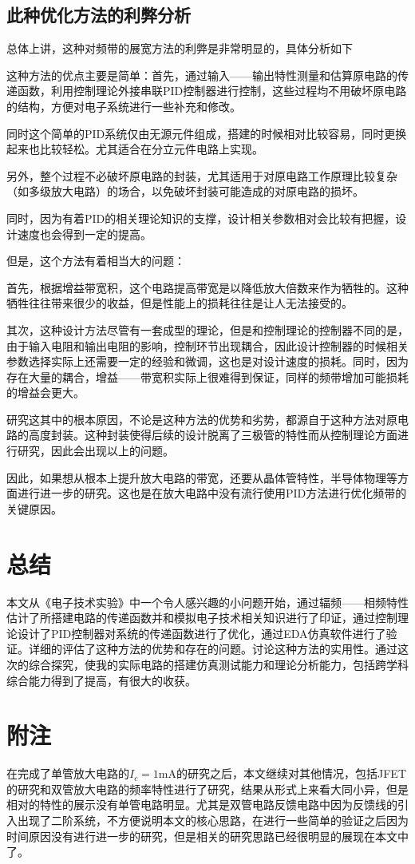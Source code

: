 \documentclass[UTF8,a4paper]{paper}
\begin{document}
\subsection{此种优化方法的利弊分析}
总体上讲，这种对频带的展宽方法的利弊是非常明显的，具体分析如下

这种方法的优点主要是简单：首先，通过输入——输出特性测量和估算原电路的传递函数，利用控制理论外接串联PID控制器进行控制，这些过程均不用破坏原电路的结构，方便对电子系统进行一些补充和修改。

同时这个简单的PID系统仅由无源元件组成，搭建的时候相对比较容易，同时更换起来也比较轻松。尤其适合在分立元件电路上实现。

另外，整个过程不必破坏原电路的封装，尤其适用于对原电路工作原理比较复杂（如多级放大电路）的场合，以免破坏封装可能造成的对原电路的损坏。

同时，因为有着PID的相关理论知识的支撑，设计相关参数相对会比较有把握，设计速度也会得到一定的提高。

但是，这个方法有着相当大的问题：

首先，根据增益带宽积，这个电路提高带宽是以降低放大倍数来作为牺牲的。这种牺牲往往带来很少的收益，但是性能上的损耗往往是让人无法接受的。

其次，这种设计方法尽管有一套成型的理论，但是和控制理论的控制器不同的是，由于输入电阻和输出电阻的影响，控制环节出现耦合，因此设计控制器的时候相关参数选择实际上还需要一定的经验和微调，这也是对设计速度的损耗。同时，因为存在大量的耦合，增益——带宽积实际上很难得到保证，同样的频带增加可能损耗的增益会更大。

研究这其中的根本原因，不论是这种方法的优势和劣势，都源自于这种方法对原电路的高度封装。这种封装使得后续的设计脱离了三极管的特性而从控制理论方面进行研究，因此会出现以上的问题。

因此，如果想从根本上提升放大电路的带宽，还要从晶体管特性，半导体物理等方面进行进一步的研究。这也是在放大电路中没有流行使用PID方法进行优化频带的关键原因。
\section{总结}
本文从《电子技术实验》中一个令人感兴趣的小问题开始，通过辐频——相频特性估计了所搭建电路的传递函数并和模拟电子技术相关知识进行了印证，通过控制理论设计了PID控制器对系统的传递函数进行了优化，通过EDA仿真软件进行了验证。详细的评估了这种方法的优势和存在的问题。讨论这种方法的实用性。通过这次的综合探究，使我的实际电路的搭建仿真测试能力和理论分析能力，包括跨学科综合能力得到了提高，有很大的收获。
\section{附注}
在完成了单管放大电路的$I_c=1\mathrm{mA}$的研究之后，本文继续对其他情况，包括JFET的研究和双管放大电路的频率特性进行了研究，结果从形式上来看大同小异，但是相对的特性的展示没有单管电路明显。尤其是双管电路反馈电路中因为反馈线的引入出现了二阶系统，不方便说明本文的核心思路，在进行一些简单的验证之后因为时间原因没有进行进一步的研究，但是相关的研究思路已经很明显的展现在本文中了。
\end{document}
